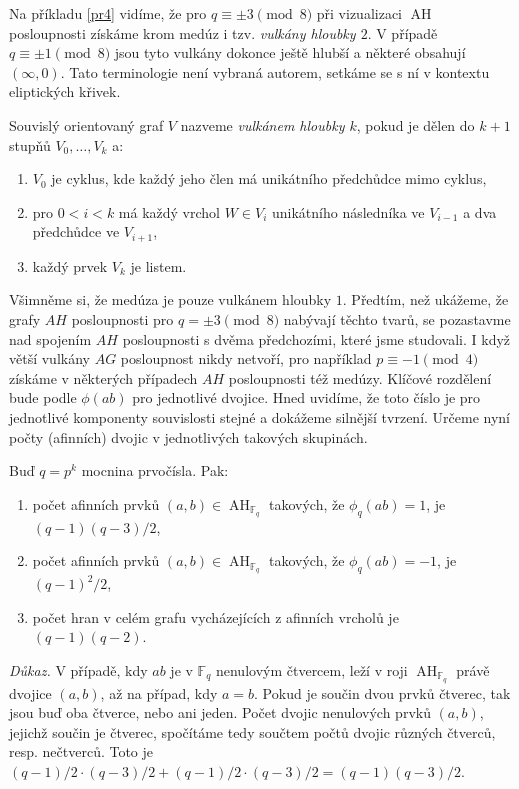 \documentclass[12pt]{report}
\DeclareMathOperator{\AH}{AH}
\begin{document}
Na příkladu \ref{pr4} vidíme, že pro $q \equiv \pm 3 \pmod{8}$ při vizualizaci $\AH$ posloupnosti získáme krom medúz i tzv. \textit{vulkány hloubky $2$}. V případě $q \equiv \pm 1 \pmod{8}$ jsou tyto vulkány dokonce ještě hlubší a některé obsahují $(\infty,0)$. Tato terminologie není vybraná autorem, setkáme se s ní v kontextu eliptických křivek. 
\begin{definice}
Souvislý orientovaný graf $V$ nazveme \textit{vulkánem hloubky $k$}, pokud je dělen do $k+1$ stupňů $V_0,\dots,V_k$ a:
\begin{enumerate}
\item $V_0$ je cyklus, kde každý jeho člen má unikátního předchůdce mimo cyklus,
\item pro $0 <i < k$ má každý vrchol $W \in V_i$ unikátního následníka ve $V_{i-1}$ a dva předchůdce ve $V_{i+1}$,
\item každý prvek $V_k$ je listem.
\end{enumerate}
\end{definice}
Všimněme si, že medúza je pouze vulkánem hloubky $1$. Předtím, než ukážeme, že grafy $AH$ posloupnosti pro $q = \pm 3 \pmod{8}$ nabývají těchto tvarů, se pozastavme nad spojením $AH$ posloupnosti s dvěma předchozími, které jsme studovali. I když větší vulkány $AG$ posloupnost nikdy netvoří, pro například $p \equiv -1 \pmod{4}$ získáme v některých případech $AH$ posloupnosti též medúzy. Klíčové rozdělení bude podle $\phi(ab)$ pro jednotlivé dvojice. Hned uvidíme, že toto číslo je pro jednotlivé komponenty souvislosti stejné a dokážeme silnější tvrzení. Určeme nyní počty (afinních) dvojic v jednotlivých takových skupinách.

\begin{veta}\label{pocetv}
Buď $q = p^k$ mocnina prvočísla. Pak:
\begin{enumerate}
\item počet afinních prvků $(a,b) \in \AH_{\mathbb{F}_q}$ takových, že $\phi_q(ab) = 1$, je $(q-1)(q-3)/2$, 
\item počet afinních prvků $(a,b) \in \AH_{\mathbb{F}_q}$ takových, že $\phi_q(ab) = -1$, je $(q-1)^2/2$,
\item počet hran v celém grafu vycházejících z afinních vrcholů je $(q-1)(q-2)$.
\end{enumerate}

\end{veta}  
\noindent \textit{Důkaz.} V případě, kdy $ab$ je v $\mathbb{F}_q$ nenulovým čtvercem, leží v roji $\AH_{\mathbb{F}_q}$ právě dvojice $(a,b)$, až na případ, kdy $a=b$. Pokud je součin dvou prvků čtverec, tak jsou buď oba čtverce, nebo ani jeden. Počet dvojic nenulových prvků $(a,b)$, jejichž součin je čtverec, spočítáme tedy součtem počtů dvojic různých čtverců, resp. nečtverců. Toto je $(q-1)/2 \cdot (q-3)/2 + (q-1)/2 \cdot (q-3)/2 =  (q-1)(q-3)/2$.
\end{document}
